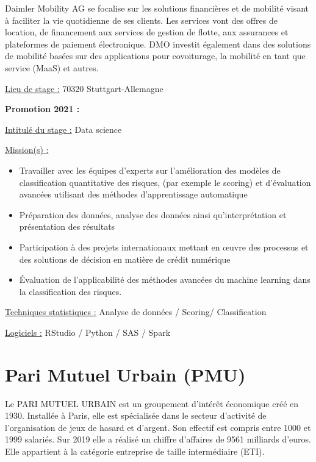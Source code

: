 \documentclass[
  letterpaper,
  DIV=11,
  numbers=noendperiod]{scrreprt}
\begin{document}
Daimler Mobility AG se focalise sur les solutions financières et de
mobilité visant à faciliter la vie quotidienne de ses clients. Les
services vont des offres de location, de financement aux services de
gestion de flotte, aux assurances et plateformes de paiement
électronique. DMO investit également dans des solutions de mobilité
basées sur des applications pour covoiturage, la mobilité en tant que
service (MaaS) et autres.

\uline{Lieu de stage :} 70320 Stuttgart-Allemagne

\textbf{Promotion 2021 :}

\uline{Intitulé du stage :} Data science

\uline{Mission(s) :}

\begin{itemize}
\item
  Travailler avec les équipes d'experts sur l'amélioration des modèles
  de classification quantitative des risques, (par exemple le scoring)
  et d'évaluation avancées utilisant des méthodes d'apprentissage
  automatique
\item
  Préparation des données, analyse des données ainsi qu'interprétation
  et présentation des résultats
\item
  Participation à des projets internationaux mettant en œuvre des
  processus et des solutions de décision en matière de crédit numérique
\item
  Évaluation de l'applicabilité des méthodes avancées du machine
  learning dans la classification des risques.
\end{itemize}

\uline{Techniques statistiques :} Analyse de données / Scoring/
Classification

\uline{Logiciels :} RStudio / Python / SAS / Spark

\hypertarget{pari-mutuel-urbain-pmu}{%
\section{\texorpdfstring{\textbf{Pari Mutuel Urbain
(PMU)}}{Pari Mutuel Urbain (PMU)}}\label{pari-mutuel-urbain-pmu}}

Le PARI MUTUEL URBAIN est un groupement d'intérêt économique créé en
1930. Installée à Paris, elle est spécialisée dans le secteur d'activité
de l'organisation de jeux de hasard et d'argent. Son effectif est
compris entre 1000 et 1999 salariés. Sur 2019 elle a réalisé un chiffre
d'affaires de 9561 milliards d'euros. Elle appartient à la catégorie
entreprise de taille intermédiaire (ETI).
\end{document}
